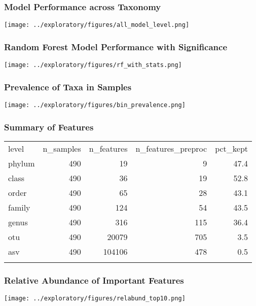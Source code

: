 \documentclass[
]{article}
\begin{document}
\hypertarget{model-performance-across-taxonomy}{%
\subsubsection{Model Performance across
Taxonomy}\label{model-performance-across-taxonomy}}

\texttt{[image: ../exploratory/figures/all\_model\_level.png]}

\hypertarget{random-forest-model-performance-with-significance}{%
\subsubsection{Random Forest Model Performance with
Significance}\label{random-forest-model-performance-with-significance}}

\texttt{[image: ../exploratory/figures/rf\_with\_stats.png]}

\hypertarget{prevalence-of-taxa-in-samples}{%
\subsubsection{Prevalence of Taxa in
Samples}\label{prevalence-of-taxa-in-samples}}

\texttt{[image: ../exploratory/figures/bin\_prevalence.png]}

\hypertarget{summary-of-features}{%
\subsubsection{Summary of Features}\label{summary-of-features}}

\begin{longtable}[]{@{}lrrrr@{}}
\toprule
level & n\_samples & n\_features & n\_features\_preproc &
pct\_kept \\ \addlinespace
\midrule
\endhead
phylum & 490 & 19 & 9 & 47.4 \\ \addlinespace
class & 490 & 36 & 19 & 52.8 \\ \addlinespace
order & 490 & 65 & 28 & 43.1 \\ \addlinespace
family & 490 & 124 & 54 & 43.5 \\ \addlinespace
genus & 490 & 316 & 115 & 36.4 \\ \addlinespace
otu & 490 & 20079 & 705 & 3.5 \\ \addlinespace
asv & 490 & 104106 & 478 & 0.5 \\ \addlinespace
\bottomrule
\end{longtable}

\hypertarget{relative-abundance-of-important-features}{%
\subsubsection{Relative Abundance of Important
Features}\label{relative-abundance-of-important-features}}

\texttt{[image: ../exploratory/figures/relabund\_top10.png]}
\end{document}
